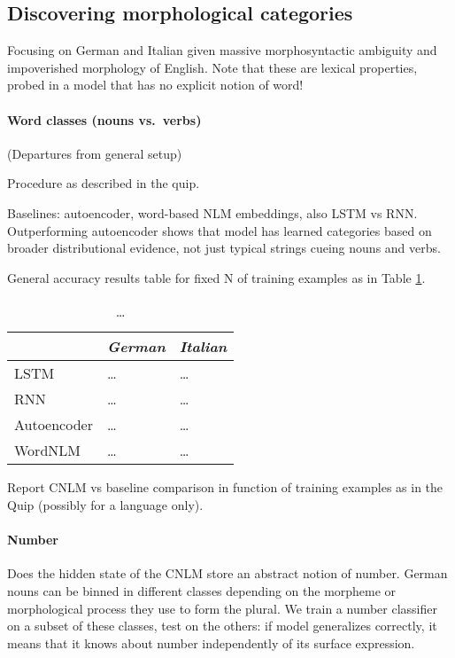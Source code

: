 \subsection{Discovering morphological categories}
\label{sec:categories}

Focusing on German and Italian given massive morphosyntactic ambiguity
and impoverished morphology of English. Note that these are lexical
properties, probed in a model that has no explicit notion of word!

\paragraph{Word classes (nouns vs.~verbs)}

(Departures from general setup)

Procedure as described in the quip.

Baselines: autoencoder, word-based NLM embeddings, also LSTM vs
RNN. Outperforming autoencoder shows that model has learned categories
based on broader distributional evidence, not just typical strings
cueing nouns and verbs.

General accuracy results table for fixed N of training examples as in Table \ref{tab:pos-results}.

\begin{table}[t]
  \begin{center}
    \begin{tabular}{l|l|l}
      \multicolumn{1}{c}{}&\emph{German}&\emph{Italian}\\
      \hline
      LSTM&\ldots&\ldots\\
      RNN&\ldots&\ldots\\
      Autoencoder&\ldots&\ldots\\
      WordNLM&\ldots&\ldots\\
    \end{tabular}
  \end{center}
  \caption{\label{tab:pos-results} \ldots}
\end{table}

Report CNLM vs baseline comparison in function of training examples as in the Quip (possibly for a language only).

\paragraph{Number}

Does the hidden state of the CNLM store an abstract notion of
number. German nouns can be binned in different classes depending on
the morpheme or morphological process they use to form the plural. We
train a number classifier on a subset of these classes, test on the
others: if model generalizes correctly, it means that it knows about
number independently of its surface expression.


